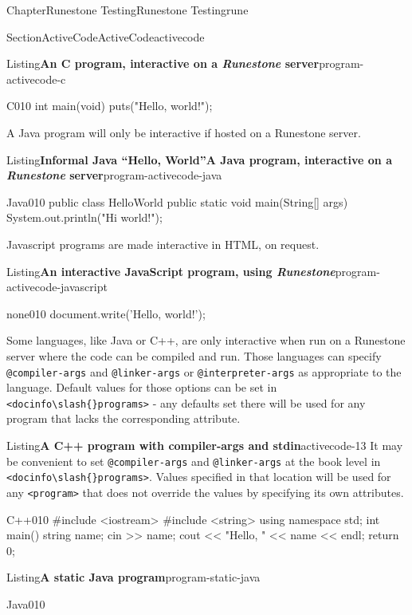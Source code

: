 \documentclass[oneside,10pt,]{book}
\newcommand{\mono}[1]{\texttt{#1}}
\newcommand{\pubtitle}[1]{\textsl{#1}}
\numberwithin{equation}{section}
\begin{document}
\begin{chapterptx}{Chapter}{Runestone Testing}{}{Runestone Testing}{}{}{rune}
\begin{sectionptx}{Section}{ActiveCode}{}{ActiveCode}{}{}{activecode}
\begin{listingptx}{Listing}{\textbf{An C program, interactive on a \pubtitle{Runestone} server}}{program-activecode-c}{}
\begin{program}{C}{0}{1}{0}
int main(void)
{
    puts("Hello, world!");
}
\end{program}
\end{listingptx}%
A Java program will only be interactive if hosted on a Runestone server.%
\begin{listingptx}{Listing}{\textbf{Informal Java ``Hello, World''A Java program, interactive on a \pubtitle{Runestone} server}}{program-activecode-java}{}%
\begin{program}{Java}{0}{1}{0}
public class HelloWorld {
    public static void main(String[] args) {
        System.out.println("Hi world!");
    }
}
\end{program}
\end{listingptx}%
Javascript programs are made interactive in HTML, on request.%
\begin{listingptx}{Listing}{\textbf{An interactive JavaScript program, using \pubtitle{Runestone}}}{program-activecode-javascript}{}%
\begin{program}{none}{0}{1}{0}
document.write('Hello, world!');
\end{program}
\end{listingptx}%
Some languages, like Java or C++, are only interactive when run on a Runestone server where the code can be compiled and run. Those languages can specify \mono{@compiler-args} and \mono{@linker-args} or \mono{@interpreter-args} as appropriate to the language. Default values for those options can be set in \mono{<docinfo\textbackslash{}slash\{\}programs>} - any defaults set there will be used for any program that lacks the corresponding attribute.%
\begin{listingptx}{Listing}{\textbf{A C++ program with compiler-args and stdin}}{activecode-13}{}%
It may be convenient to set \mono{@compiler-args} and \mono{@linker-args} at the book level in \mono{<docinfo\textbackslash{}slash\{\}programs>}. Values specified in that location will be used for any \mono{<program>} that does not override the values by specifying its own attributes.%
\begin{program}{C++}{0}{1}{0}
#include <iostream>
#include <string>
using namespace std;
int main() {
    string name;
    cin >> name;
    cout << "Hello, " << name << endl;
    return 0;
}
\end{program}
\end{listingptx}%
\begin{listingptx}{Listing}{\textbf{A static Java program}}{program-static-java}{}%
\begin{program}{Java}{0}{1}{0}

\end{program}
\end{listingptx}
\end{sectionptx}
\end{chapterptx}
\end{document}
